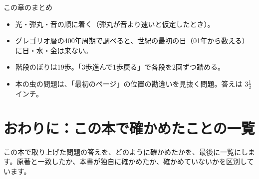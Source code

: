 \documentclass[a4paper,11pt,openany]{ltjsbook}
\begin{document}
\begin{pointbox}{この章のまとめ}
\begin{itemize}[leftmargin=*]
\item 光・弾丸・音の順に着く（弾丸が音より速いと仮定したとき）。
\item グレゴリオ暦の400年周期で調べると、世紀の最初の日（01年から数える）に日・水・金は来ない。
\item 階段のぼりは19歩。「3歩進んで1歩戻る」で各段を2回ずつ踏める。
\item 本の虫の問題は、「最初のページ」の位置の勘違いを見抜く問題。答えは $3\tfrac12$ インチ。
\end{itemize}
\end{pointbox}

\chapter*{おわりに：この本で確かめたことの一覧}

この本で取り上げた問題の答えを、どのように確かめたかを、最後に一覧にします。原著と一致したか、本書が独自に確かめたか、確かめていないかを区別しています。
\end{document}

